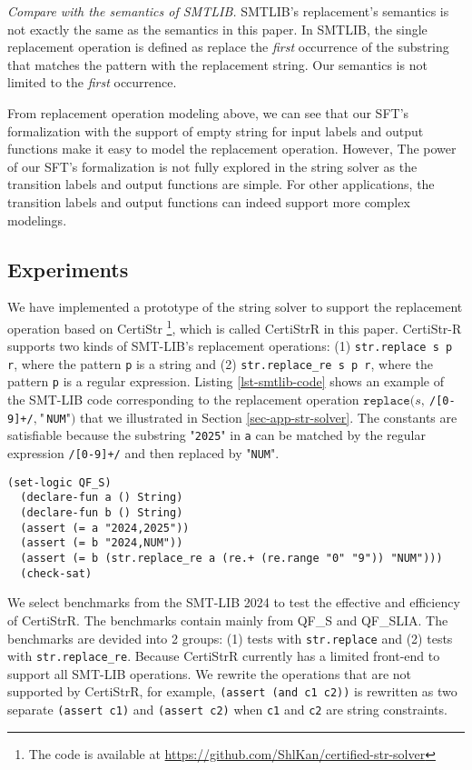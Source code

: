 \documentclass[a4paper,UKenglish,cleveref, autoref, thm-restate]{lipics-v2021}
\begin{document}
  \emph{Compare with the semantics of SMTLIB.} SMTLIB's replacement's semantics is not exactly the same as the semantics  in this paper. In SMTLIB, the single replacement operation is defined as replace the \emph{first} occurrence of the substring that matches the pattern with the replacement string. Our semantics is not limited to the \emph{first} occurrence.

  From replacement operation modeling above, we can see that our SFT's formalization with the support of empty string for input labels and output functions make it easy to model the replacement operation.
  However,
  The power of our SFT's formalization is not fully explored in the string solver as the transition labels and output functions are simple. For other applications, the transition labels and output functions can indeed support more complex modelings.


\subsection{Experiments}

We have implemented a prototype of the string solver to support the replacement operation based on CertiStr \cite{cpp/KanLRS22} \footnote{The code is available at \url{https://github.com/ShlKan/certified-str-solver}}, which is called CertiStrR in this paper.
%
CertiStr-R supports two kinds of SMT-LIB's replacement operations: (1) \texttt{str.replace s p r}, where the pattern \texttt{p} is a string and (2) \texttt{str.replace\_re s p r}, where the pattern \texttt{p} is a regular expression. Listing \ref{lst-smtlib-code} shows an example of the SMT-LIB code corresponding to the replacement operation $\texttt{replace}(s,~$\texttt{/[0-9]+/}$,~\text{"}$\texttt{NUM}$\text{"})$ that we illustrated in Section \ref{sec-app-str-solver}. The constants are satisfiable because the 
substring "\texttt{2025}" in \texttt{a} can be matched by the regular expression \texttt{/[0-9]+/} and then replaced by "\texttt{NUM}".
\begin{lstlisting}[language=SMTLIB, caption={Example SMT-LIB Code}, label={lst-smtlib-code}]
  (set-logic QF_S)
  (declare-fun a () String)
  (declare-fun b () String)
  (assert (= a "2024,2025"))
  (assert (= b "2024,NUM"))
  (assert (= b (str.replace_re a (re.+ (re.range "0" "9")) "NUM")))
  (check-sat)
  \end{lstlisting}



We select benchmarks from the SMT-LIB 2024 \cite{smtlib_benchmarks} to test the effective and efficiency of CertiStrR. The benchmarks contain mainly from QF\_S and QF\_SLIA. The benchmarks are devided into 2 groups: (1) tests with \texttt{str.replace} and (2) tests with \texttt{str.replace\_re}. Because CertiStrR currently has a limited front-end to support all SMT-LIB operations. We rewrite the operations that are not supported by CertiStrR, for example, \texttt{(assert (and c1 c2))} is rewritten as two separate \texttt{(assert c1)} and \texttt{(assert c2)} when \texttt{c1} and \texttt{c2} are string constraints. 
\end{document}
